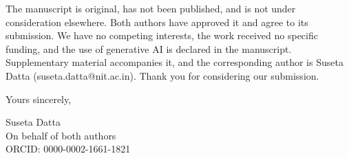 \documentclass[11pt]{article}
\begin{document}
The manuscript is original, has not been published, and is not under
consideration elsewhere. Both authors have approved it and agree to its
submission. We have no competing interests, the work received no specific
funding, and the use of generative AI is declared in the manuscript.
Supplementary material accompanies it, and the corresponding author is
Suseta Datta (suseta.datta@nit.ac.in). Thank you for considering our
submission.

Yours sincerely,

Suseta Datta\\
On behalf of both authors\\
ORCID: 0000-0002-1661-1821
\end{document}
